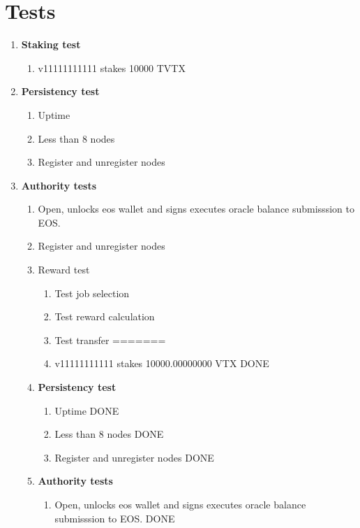 \documentclass[]{article}
\begin{document}
\section{Tests}
					\begin{enumerate}
						\item \textbf{Staking test}
						\begin{enumerate}
<<<<<<< HEAD
							\item v11111111111 stakes 10000 TVTX  
						\end{enumerate}
						\item \textbf{Persistency test}  
							\begin{enumerate}
								\item Uptime\textit{} 
								\item Less than 8 nodes 
								\item Register and unregister nodes  
							\end{enumerate}
						\item \textbf{Authority tests}
							\begin{enumerate}
							\item Open, unlocks eos wallet and signs executes oracle balance submisssion to EOS. 
							\item Register and unregister nodes  
							\item Reward test	
								\begin{enumerate}
										\item Test job selection 	
										\item Test reward calculation 	
										\item Test transfer 
=======
							\item v11111111111 stakes 10000.00000000 VTX  {\color{green} DONE}
						\end{enumerate}
						\item \textbf{Persistency test}  
							\begin{enumerate}
								\item Uptime\textit{} {\color{green} DONE}
								\item Less than 8 nodes {\color{green} DONE}
								\item Register and unregister nodes  {\color{green} DONE}
							\end{enumerate}
						\item \textbf{Authority tests}
							\begin{enumerate}
							\item Open, unlocks eos wallet and signs executes oracle balance submisssion to EOS. {\color{green} DONE}

\end{enumerate}
\end{enumerate}
\end{enumerate}
\end{document}
